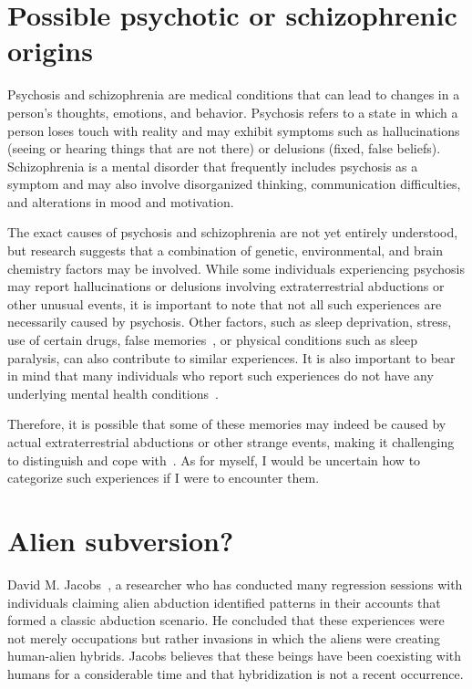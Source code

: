 \section{Possible psychotic or schizophrenic origins}
\label{2023-UFO-part-Perception-abductions-pposo}

Psychosis and schizophrenia are medical conditions that can lead to changes in a person's thoughts, emotions, and behavior. Psychosis refers to a state in which a person loses touch with reality and may exhibit symptoms such as hallucinations (seeing or hearing things that are not there) or delusions (fixed, false beliefs). Schizophrenia is a mental disorder that frequently includes psychosis as a symptom and may also involve disorganized thinking, communication difficulties, and alterations in mood and motivation.

The exact causes of psychosis and schizophrenia are not yet entirely understood, but research suggests that a combination of genetic, environmental, and brain chemistry factors may be involved. While some individuals experiencing psychosis may report hallucinations or delusions involving extraterrestrial abductions or other unusual events, it is important to note that not all such experiences are necessarily caused by psychosis. Other factors, such as sleep deprivation, stress, use of certain drugs, false memories~\cite{Clancy_2002m}, or physical conditions such as sleep paralysis, can also contribute to similar experiences. It is also important to bear in mind that many individuals who report such experiences do not have any underlying mental health conditions~\cite{Holden_2002}.

Therefore, it is possible that some of these memories may indeed be caused by actual extraterrestrial abductions or other strange events, making it challenging to distinguish and cope with~\cite{Appelle1995,Appelle2000}. As for myself, I would be uncertain how to categorize such experiences if I were to encounter them.


\section{Alien subversion?}
\label{2023-UFO-part-Perception-abductions-alsub}

David M. Jacobs~\cite{Jacobs1993Apr,Jacobs1999Mar,Jacobs2015Sep,Jacobs2015Oct},
a researcher who has conducted many regression sessions with individuals claiming alien abduction identified patterns in their accounts that formed a classic abduction scenario. He concluded that these experiences were not merely occupations but rather invasions in which the aliens were creating human-alien hybrids. Jacobs believes that these beings have been coexisting with humans for a considerable time and that hybridization is not a recent occurrence.

